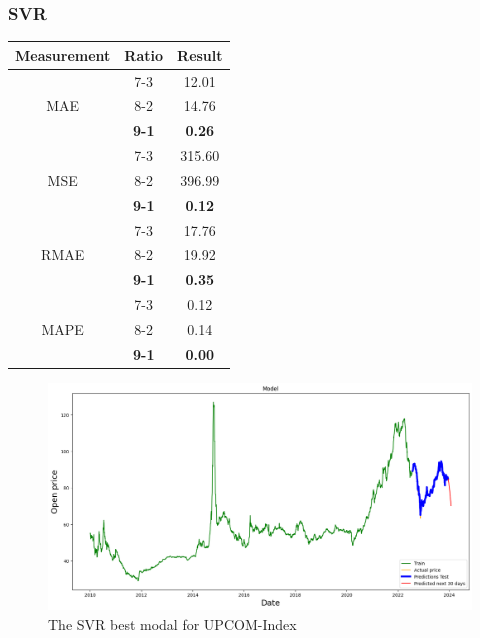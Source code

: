 \documentclass{ieeeojies}
\begin{document}
\subsubsection{SVR}
\begin{table}[H]
    \centering
    \begin{tabular}{|c|c|c|}
        \hline
         Measurement & Ratio &  Result  \\
        \hline
             & 7-3 & 12.01 \\
        MAE  & 8-2 & 14.76  \\
            & \textbf{9-1} &\textbf{ 0.26} \\
        \hline
           & 7-3 & 315.60  \\
        MSE  & 8-2 & 396.99 \\
            & \textbf{9-1} & \textbf{0.12}  \\
        \hline
           & 7-3 & 17.76 \\
        RMAE  & 8-2 & 19.92  \\
            & \textbf{9-1} & \textbf{0.35} \\
        \hline
           & 7-3 & 0.12  \\
        MAPE  & 8-2 & 0.14  \\
            & \textbf{9-1} & \textbf{0.00} \\
        \hline
    \end{tabular}
    \label{table:example}
\end{table}
\begin{figure}[H]
    \centering
    \includegraphics[width=0.8\linewidth]{SVR UPCOM 91.jpg}
    \caption{The SVR best modal for UPCOM-Index}
    \label{fig:example}
\end{figure}
\end{document}
